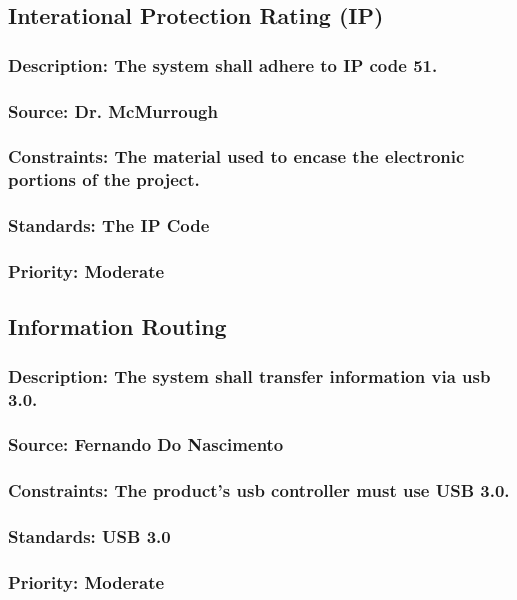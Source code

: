 \subsection{Interational Protection Rating (IP)}
\subsubsection{Description: The system shall adhere to IP code 51.}
\subsubsection{Source: Dr. McMurrough}
\subsubsection{Constraints: The material used to encase the electronic portions of the project.}
\subsubsection{Standards: The IP Code}
\subsubsection{Priority: Moderate}

\subsection{Information Routing}
\subsubsection{Description: The system shall transfer information via usb 3.0.}
\subsubsection{Source: Fernando Do Nascimento}
\subsubsection{Constraints: The product's usb controller must use USB 3.0.}
\subsubsection{Standards: USB 3.0}
\subsubsection{Priority: Moderate}
